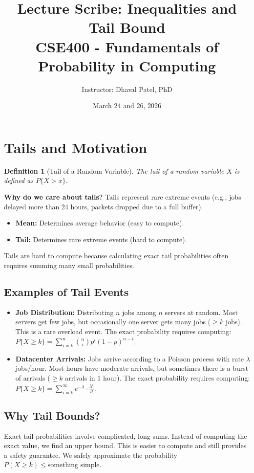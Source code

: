 \documentclass[11pt]{article}
\title{Lecture Scribe: Inequalities and Tail Bound\\
\large CSE400 - Fundamentals of Probability in Computing}
\author{Instructor: Dhaval Patel, PhD}
\date{March 24 and 26, 2026}
\newtheorem{definition}{Definition}
\begin{document}
\maketitle

\section{Tails and Motivation}

\begin{definition}[Tail of a Random Variable]
The tail of a random variable $X$ is defined as $P\{X > x\}$.
\end{definition}

\noindent\textbf{Why do we care about tails?}
Tails represent rare extreme events (e.g., jobs delayed more than 24 hours, packets dropped due to a full buffer). 
\begin{itemize}
    \item \textbf{Mean:} Determines average behavior (easy to compute).
    \item \textbf{Tail:} Determines rare extreme events (hard to compute).
\end{itemize}
Tails are hard to compute because calculating exact tail probabilities often requires summing many small probabilities.

\subsection{Examples of Tail Events}
\begin{itemize}
    \item \textbf{Job Distribution:} Distributing $n$ jobs among $n$ servers at random. Most servers get few jobs, but occasionally one server gets many jobs ($\ge k$ jobs). This is a rare overload event. The exact probability requires computing: $P\{X \ge k\} = \sum_{i=k}^{n} \binom{n}{i} p^i (1-p)^{n-i}$.
    \item \textbf{Datacenter Arrivals:} Jobs arrive according to a Poisson process with rate $\lambda$ jobs/hour. Most hours have moderate arrivals, but sometimes there is a burst of arrivals ($\ge k$ arrivals in 1 hour). The exact probability requires computing: $P\{X \ge k\} = \sum_{i=k}^{\infty} e^{-\lambda} \cdot \frac{\lambda^i}{i!}$.
\end{itemize}

\subsection{Why Tail Bounds?}
Exact tail probabilities involve complicated, long sums. Instead of computing the exact value, we find an upper bound. This is easier to compute and still provides a safety guarantee. We safely approximate the probability $P(X \ge k) \le \text{something simple}$.
\end{document}
